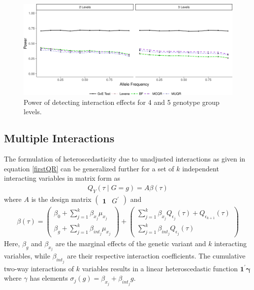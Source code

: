 \documentclass[12pt]{article}
\begin{document}
\begin{appendices}
\newpage
\begin{figure}[h!]
	\centering
	\includegraphics[width=0.8 \textwidth, height=0.45\textwidth]{figures/power_nominal_cVar45.jpg}
	\caption{Power of detecting interaction effects for 4 and 5 genotype group levels.}
	\label{fig:PowLevel45}
\end{figure}

\newpage
\subsection{Multiple Interactions}
\indent \indent The formulation of heteroscedasticity due to unadjusted interactions as given in equation \ref{firstQR} can be generalized further for a set of $k$ independent interacting variables in matrix form as
\begin{equation}
\begin{split}
Q_Y (\tau \mid G=g) = A \beta (\tau)
\end{split}
\end{equation}
where $A$ is the design matrix $\begin{pmatrix} \bm{1} & G^{'} \end{pmatrix}$ and 
\begin{equation}
\begin{split}
\beta (\tau)=    
\begin{pmatrix}
\beta_0+ \sum_{j=1}^{k} \beta_{x_j}\mu_{x_j} \\
\beta_g + \sum_{j=1}^{k}\beta_{int_j}\mu_{x_j} 
\end{pmatrix} +
\begin{pmatrix}
\sum_{j=1}^{k} \beta_{x_j} Q_{\epsilon_{j}}(\tau) + Q_{\epsilon_{k+1}}(\tau) \\
\sum_{j=1}^{k} \beta_{int_j} Q_{\epsilon_{j}} (\tau) 
\end{pmatrix}
\end{split}
\end{equation}
Here, $\beta_g$ and $\beta_{x_{j}}$ are the marginal effects of the genetic variant and $k$ interacting variables, while $\beta_{int_j}$ are their respective interaction coefficients. The cumulative two-way interactions of $k$ variables results in a linear heteroscedastic function $\bm{1}^{'}\bm{\gamma}$ where $\gamma$ has elements $\sigma_j(g) = \beta_{x_j} +  \beta_{int_j} g$. 


\end{appendices}
\end{document}
